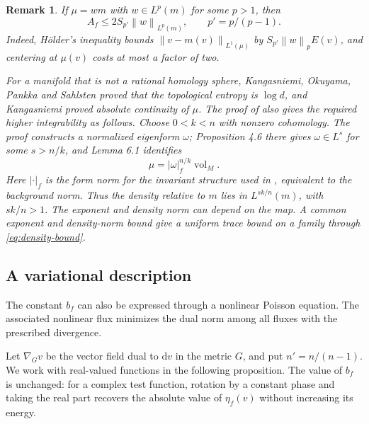 \documentclass[10pt,a4paper]{amsart}
\newtheorem{remark}[theorem]{Remark}
\newcommand{\norm}[1]{\left\lVert #1\right\rVert}
\newcommand{\dd}{\mathrm d}
\DeclareMathOperator{\vol}{vol}
\numberwithin{equation}{section}
\begin{document}
\begin{remark}\label{rem:density}
If $\mu=w m$ with $w\in L^p(m)$ for some $p>1$, then
\begin{equation}\label{eq:density-bound}
 A_f\le2S_{p'}\norm{w}_{L^p(m)},\qquad p'=p/(p-1).
\end{equation}
Indeed, H\"older's inequality bounds $\norm{v-m(v)}_{L^1(\mu)}$ by $S_{p'}\norm{w}_pE(v)$, and centering at $\mu(v)$ costs at most a factor of two.

For a manifold that is not a rational homology sphere, Kangasniemi, Okuyama, Pankka and Sahlsten \cite{KOPS21} proved that the topological entropy is $\log d$, and Kangasniemi \cite{Kan21} proved absolute continuity of $\mu$. The proof of \cite[Theorem 1.2]{Kan21} also gives the required higher integrability as follows. Choose $0<k<n$ with nonzero cohomology. The proof constructs a normalized eigenform $\omega$; Proposition 4.6 there gives $\omega\in L^s$ for some $s>n/k$, and Lemma 6.1 identifies
\[
 \mu=|\omega|_f^{n/k}\vol_M.
\]
Here $|\cdot|_f$ is the form norm for the invariant structure used in \cite{Kan21}, equivalent to the background norm. Thus the density relative to $m$ lies in $L^{sk/n}(m)$, with $sk/n>1$. The exponent and density norm can depend on the map. A common exponent and density-norm bound give a uniform trace bound on a family through \eqref{eq:density-bound}.
\end{remark}

\subsection{A variational description}

The constant $b_f$ can also be expressed through a nonlinear Poisson equation. The associated nonlinear flux minimizes the dual norm among all fluxes with the prescribed divergence.

Let $\nabla_Gv$ be the vector field dual to $\dd v$ in the metric $G$, and put $n'=n/(n-1)$. We work with real-valued functions in the following proposition. The value of $b_f$ is unchanged: for a complex test function, rotation by a constant phase and taking the real part recovers the absolute value of $\eta_f(v)$ without increasing its energy.
\end{document}
